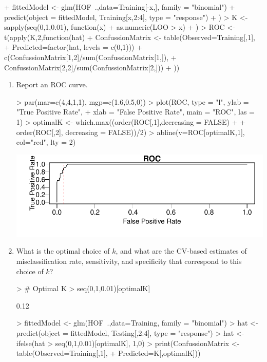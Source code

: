 \documentclass[12pt,a4paper]{paper}
\begin{document}
\begin{enumerate}
\begin{enumerate}
\begin{Schunk}
\begin{Sinput}
{+   fittedModel <- glm(HOF~.,data=Training[-x,], family = "binomial")
+   predict(object = fittedModel, Training[x,2:4], type = "response")
+ })
> K <- sapply(seq(0,1,0.01), function(x){
+   as.numeric(LOO > x)
+ })
> ROC <- t(apply(K,2,function(hat){
+   ConfussionMatrix <- table(Observed=Training[,1],
+                             Predicted=factor(hat, levels = c(0,1)))
+   c(ConfussionMatrix[1,2]/sum(ConfussionMatrix[1,]),
+     ConfussionMatrix[2,2]/sum(ConfussionMatrix[2,]))
+ }))
\end{Sinput}
\end{Schunk}
\begin{enumerate}
\item Report an ROC curve.
\begin{Schunk}
\begin{Sinput}
> par(mar=c(4,4,1,1), mgp=c(1.6,0.5,0))
> plot(ROC, type = "l", ylab = "True Positive Rate", 
+      xlab = "False Positive Rate", main = "ROC", las = 1)
> optimalK <- which.max((order(ROC[,1],decreasing = FALSE) +
+                         order(ROC[,2], decreasing = FALSE))/2)
> abline(v=ROC[optimalK,1], col="red", lty = 2)
\end{Sinput}
\end{Schunk}
\includegraphics{HW5_DanielOsorio-015}
\item What is the optimal choice of $k$, and what are the CV-based estimates of misclassification rate, sensitivity, and specificity that correspond to this choice of $k$?
\begin{Schunk}
\begin{Sinput}
> # Optimal K
> seq(0,1,0.01)[optimalK]
\end{Sinput}
\begin{Soutput}
[1] 0.12
\end{Soutput}
\begin{Sinput}
> fittedModel <- glm(HOF~.,data=Training, family = "binomial")
> hat <- predict(object = fittedModel, Testing[,2:4], type = "response")
> hat <- ifelse(hat > seq(0,1,0.01)[optimalK], 1,0)
> print(ConfussionMatrix <- table(Observed=Training[,1],
+                                 Predicted=K[,optimalK]))

\end{Sinput}
\end{Schunk}
\end{enumerate}
\end{enumerate}
\end{enumerate}
\end{document}
